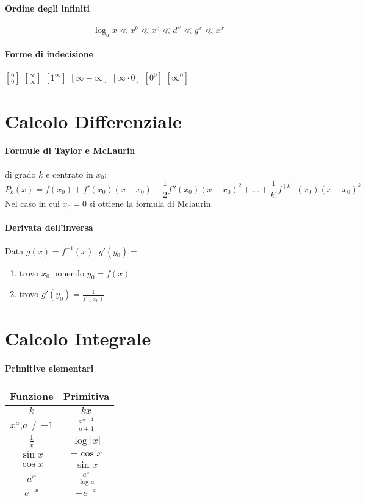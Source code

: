 \documentclass[12pt, a4paper, openany]{book}
\begin{document}
	\paragraph*{Ordine degli infiniti}
	$$ \log_ax\ll x^b\ll x^c\ll d^x\ll g^x\ll x^x $$


	\paragraph*{Forme di indecisione}
$[\frac{0}{0}]$ $[\frac{\infty}{\infty}]$ $[1^\infty]$ $[\infty - \infty]$ $[\infty \cdot 0]$ $[0^0]$ $[\infty^0]$

	\section*{Calcolo Differenziale}
	\paragraph*{Formule di Taylor e McLaurin} di grado $k$ e centrato in $x_0$:
	$$P_k(x)=f(x_0)+f'(x_0)(x-x_0) + \frac{1}{2}f''(x_0)(x-x_0)^2 +... + \frac{1}{k!}f^{(k)}(x_0)(x-x_0)^k$$
	Nel caso in cui $x_0=0$ si ottiene la formula di Mclaurin.
	\paragraph*{Derivata dell'inversa} Data $g(x) = f^{-1}(x)$, $g'(y_0)=$
\begin{enumerate}
	\item trovo $x_0$ ponendo $y_0=f(x)$
	\item trovo $g'(y_0)=\frac{1}{f'(x_0)}$
\end{enumerate}


\section*{Calcolo Integrale}
\paragraph*{Primitive elementari}
\begin{tabular}{ |c|c| }
	\hline
	Funzione        & Primitiva             \\
	\hline
	$k$             & $kx$                  \\
	$x^a$,$a\neq-1$ & $\frac{x^{a+1}}{a+1}$ \\
	$\frac{1}{x}$   & $\log|x|$             \\
	$\sin x$        & $-\cos x$             \\
	$\cos x $       & $\sin x$              \\
	$a^x$           & $\frac{a^x}{\log a}$  \\
	\hline
	$e^{-x}$        & $-e^{-x}$             \\
\end{tabular}
\end{document}
